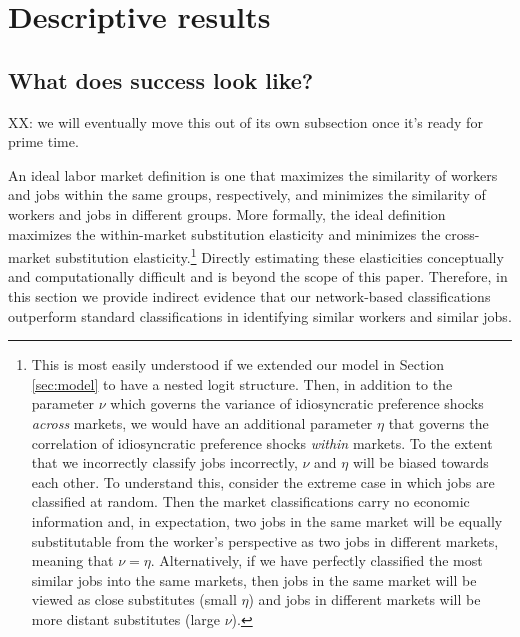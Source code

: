 \documentclass[12pt]{article}
\theoremstyle{definition}
\theoremstyle{plain}
\begin{document}
\section{Descriptive results}
\label{sec:descriptive_results}


\subsection{What does success look like?}

XX: we will eventually move this out of its own subsection once it's ready for prime time.

An ideal labor market definition is one that maximizes the similarity of workers and jobs within the same groups, respectively, and minimizes the similarity of workers and jobs in different groups. More formally, the ideal definition maximizes the within-market substitution elasticity and minimizes the cross-market substitution elasticity.\footnote{This is most easily understood if we extended our model in Section \ref{sec:model} to have a nested logit structure. Then, in addition to the parameter $\nu$ which governs the variance of idiosyncratic preference shocks \emph{across} markets, we would have an additional parameter $\eta$ that governs the correlation of idiosyncratic preference shocks \emph{within} markets. To the extent that we incorrectly classify jobs incorrectly, $\nu$ and $\eta$ will be biased towards each other. To understand this, consider the extreme case in which jobs are classified at random. Then the market classifications carry no economic information and, in expectation, two jobs in the same market will be equally substitutable from the worker's perspective as two jobs in different markets, meaning that $\nu=\eta$. Alternatively, if we have perfectly classified the most similar jobs into the same markets, then jobs in the same market will be viewed as close substitutes (small $\eta$) and jobs in different markets will be more distant substitutes (large $\nu$). } Directly estimating these elasticities conceptually and computationally difficult and is beyond the scope of this paper. Therefore, in this section we provide indirect evidence that our network-based classifications outperform standard classifications in identifying similar workers and similar jobs. 
\end{document}
